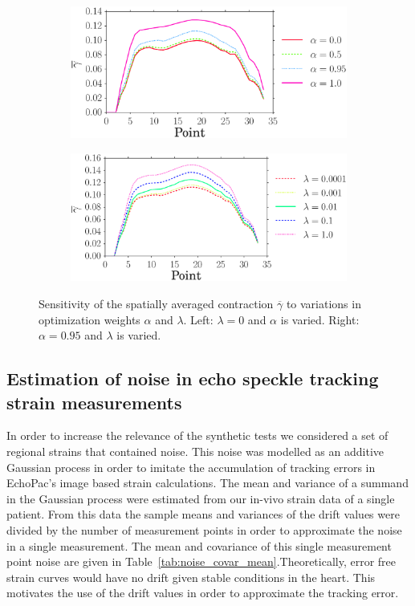 \begin{figure}[htbp]
\centering
\begin{subfigure}[t]{0.49\textwidth}
     {\includegraphics[width=\textwidth]{mean_gamma_varying_alpha}}
     \caption*{\label{fig:gamma_sense_alpha}}
\end{subfigure}
\begin{subfigure}[t]{0.49\textwidth}
    {\includegraphics[width=\textwidth]{mean_gamma_varying_lambda}}
    \caption*{\label{fig:gamma_sense_lmbda}}
\end{subfigure}
\caption{Sensitivity of the spatially averaged contraction $\overline{\gamma}$ 
to variations in optimization weights $\alpha$ and $\lambda$. Left: $\lambda = 0$ and 
$\alpha$ is varied. Right: $\alpha = 0.95$ and $\lambda$ is varied.}
\label{fig:gamma_sense_alpha_lambda}
\end{figure}


\subsection{Estimation of noise in echo speckle tracking strain measurements}
\label{sec:strain_noise_est}
In order to increase the relevance of the synthetic tests we
considered a set of regional strains that contained noise. This
noise was modelled as an additive Gaussian process in order to imitate
the accumulation of tracking errors in EchoPac's image based strain
calculations. The mean and variance of a summand in the Gaussian
process were estimated from our in-vivo strain data of a single patient. From this data 
the sample means and variances of
the drift values were divided by the number of measurement points in order to approximate the noise in 
a single measurement. The mean and covariance of this single measurement point noise are given in
Table~\ref{tab:noise_covar_mean}.Theoretically, error free strain
curves would have no drift given stable conditions in the heart.
This motivates the use of the drift values in order to approximate 
the tracking error.


